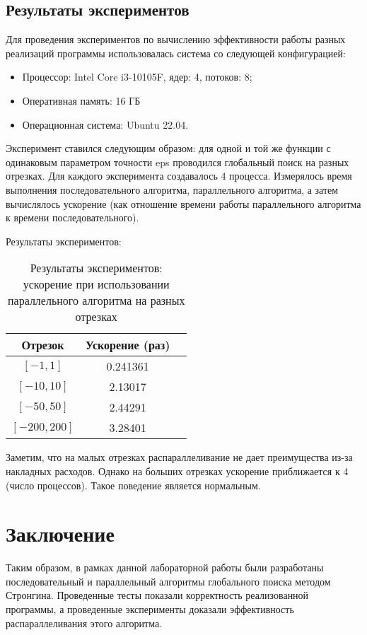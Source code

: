 \documentclass{article}
\begin{document}
\subsection*{Результаты экспериментов}
Для проведения экспериментов по вычислению эффективности работы разных реализаций программы использовалась система со следующей конфигурацией:
\begin{itemize}
\item Процессор: Intel Core i3-10105F, ядер: 4, потоков: 8;
\item Оперативная память: 16 ГБ
\item Операционная система: Ubuntu 22.04.
\end{itemize}
Эксперимент ставился следующим образом: для одной и той же функции с одинаковым параметром точности eps проводился глобальный поиск на разных отрезках. Для каждого эксперимента создавалось 4 процесса. Измерялось время выполнения последовательного алгоритма, параллельного алгоритма, а затем вычислялось ускорение (как отношение времени работы параллельного алгоритма к времени последовательного).
\par Результаты экспериментов:
\begin{table}[!h]
\centering
\begin{tabular}{| c | c | c |}
\hline
Отрезок & Ускорение (раз) \\
\hline
\([-1, 1]\)        & 0.241361 \\
\([-10, 10]\)        & 2.13017 \\
\([-50, 50]\)      & 2.44291 \\
\([-200, 200]\)      & 3.28401 \\
\hline
\end{tabular}
\caption{Результаты экспериментов: ускорение при использовании параллельного алгоритма на разных отрезках}
\end{table}

Заметим, что на малых отрезках распараллеливание не дает преимущества из-за накладных расходов. Однако на больших отрезках ускорение приближается к 4 (число процессов). Такое поведение является нормальным.

\newpage

\section*{Заключение}
Таким образом, в рамках данной лабораторной работы были разработаны последовательный и параллельный алгоритмы глобального поиска методом Стронгина. Проведенные тесты показали корректность реализованной программы, а проведенные эксперименты доказали эффективность распараллеливания этого алгоритма.
\newpage
\end{document}
